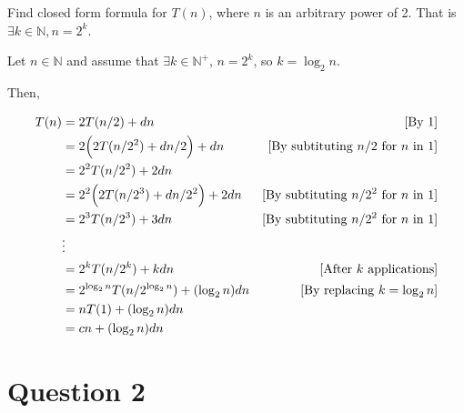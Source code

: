 \documentclass[12pt]{article}
\begin{document}
\begin{itemize}
\begin{mdframed}
        Find closed form formula for $T(n)$, where $n$ is an arbitrary power of 2.
        That is $\exists k \in \mathbb{N}, n = 2^k$.

        \bigskip

        Let $n \in \mathbb{N}$ and assume that $\exists k \in \mathbb{N}^+$, $n = 2^k$, so $k = \log_2 n$.

        \bigskip

        Then,

        \begin{align}
            T(n) &= 2T(n/2) + dn & [\text{By 1}]\\
            &= 2\Bigl(2T(n/2^2) + dn/2\Bigr) + dn & [\text{By subtituting $n/2$ for $n$ in 1}]\\
            &= 2^2T(n/2^2) + 2dn\\
            &= 2^2\Bigl(2T(n/2^3) + dn/2^2\Bigr) + 2dn & [\text{By subtituting $n/2^2$ for $n$ in 1}]\\
            &= 2^3T(n/2^3) + 3dn & [\text{By subtituting $n/2^2$ for $n$ in 1}]\\
            &\vdots\\
            &= 2^kT(n/2^k) + kdn & [\text{After $k$ applications}]\\
            &= 2^{\log_2 n}T(n/2^{\log_2 n}) + (\log_2 n)dn & [\text{By replacing $k = \log_2 n$}]\\
            &= nT(1) + (\log_2 n)dn\\
            &= cn + (\log_2 n)dn
        \end{align}
    \end{mdframed}

\end{itemize}

\section*{Question 2}
\end{document}
